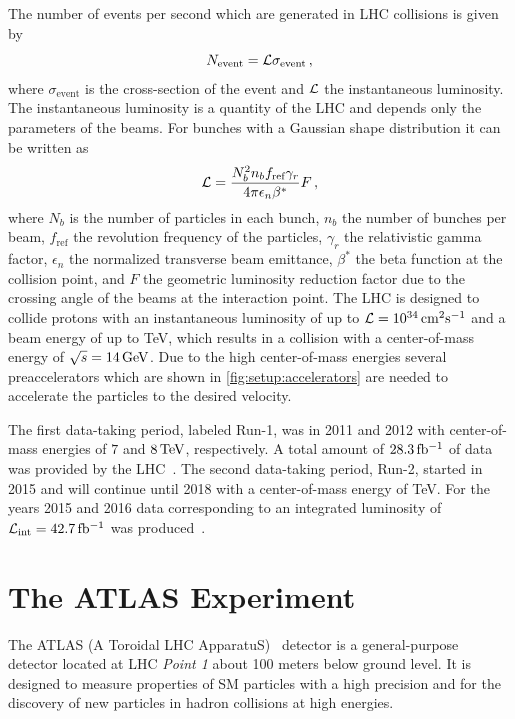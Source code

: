 The number of events per second which are generated in LHC collisions is given by
\begin{equation}
    \label{eq:lumi:def}
    N_\text{event} = \mathcal{L} \sigma_\text{event} \,,
\end{equation}
where $\sigma_\text{event}$ is the cross-section of the event and $\mathcal{L}$ the instantaneous luminosity.
The instantaneous luminosity is a quantity of the LHC and depends only the parameters of the beams.
For bunches with a Gaussian shape distribution it can be written as~\cite{LHC}
\begin{equation}
    \label{eq:lumi:dependencies}
    \mathcal{L} = \frac{N_b^2 n_b f_\text{ref} \gamma_r}{4 \pi \epsilon_n \beta^*} F \,,
\end{equation}
where $N_b$ is the number of particles in each bunch, $n_b$ the number of bunches per beam, $f_\text{ref}$ the revolution
frequency of the particles, $\gamma_r$ the relativistic gamma factor, $\epsilon_n$ the normalized transverse beam emittance,
$\beta^*$ the beta function at the collision point, and $F$ the geometric luminosity reduction factor
due to the crossing angle of the beams at the interaction point.
The LHC is designed to collide protons with an instantaneous luminosity of up to $\lumi = \unit[10^{34}]{cm^2 s^{-1}}$
and a beam energy of up to \unit[7]{TeV}, which results in a collision with a center-of-mass energy of
$\sqrt{s} = \unit[14]{GeV}$.
Due to the high center-of-mass energies several preaccelerators which are shown in \cref{fig:setup:accelerators}
are needed to accelerate the particles to the desired velocity.

The first data-taking period, labeled Run-1, was in 2011 and 2012 with center-of-mass energies of $7$ and
$\unit[8]{TeV}$, respectively.
A total amount of $\unit[28.3]{fb^{-1}}$ of data was provided by the LHC~\cite{PublicLumiRun1}.
The second data-taking period, Run-2, started in 2015 and will continue until 2018 with a center-of-mass energy of \unit[13]{TeV}.
For the years 2015 and 2016 data corresponding to an integrated luminosity of $\lumi_\text{int} = \unit[42.7]{fb^{-1}}$ was produced~\cite{PublicLumiRun2}.

\section{The ATLAS Experiment}\label{sec:setup:atlas}

The ATLAS (A Toroidal LHC ApparatuS)~\cite{ATLAS} detector is a general-purpose detector located at LHC \emph{Point 1}
about 100 meters below ground level.
It is designed to measure properties of SM particles with a high precision and for the discovery of new particles
in hadron collisions at high energies.

